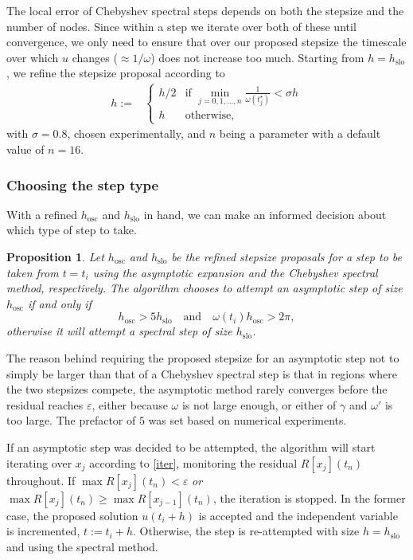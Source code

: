\documentclass[10pt]{article}
\newtheorem{pro}[thm]{Proposition}
\newcommand{\om}{\omega}
\newcommand{\g}{\gamma}
\begin{document}
The local error of Chebyshev spectral steps depends on both the stepsize and
the number of nodes. Since within a step we iterate over both of these until
convergence, we only need to ensure that over our proposed stepsize the
timescale over which $u$ changes ($\approx 1/\om$) does not increase too much. Starting from $h =
h_{\text{slo}}$, we refine the stepsize proposal according to
\begin{align}
    h :=& \begin{cases}
        h/2 &\text{if } \min\limits_{j = 0, 1, \ldots, n}\frac{1}{\om(t^{\star}_j)} < \sigma h \\
        h &\text{otherwise},
    \end{cases}
\end{align}
with $\sigma = 0.8$, chosen experimentally, and $n$ being a
parameter with a default value of $n = 16$.

\subsubsection{Choosing the step type}
\label{steptype}

With a refined $h_{\text{osc}}$ and $h_{\text{slo}}$ in hand, we can make an informed decision about which type of step to take.
\begin{pro}\label{steptypechoose}
    Let $h_{\text{osc}}$ and $h_{\text{slo}}$ be the refined stepsize proposals
    for a step to be taken from $t = t_i$ using the asymptotic expansion and the Chebyshev
    spectral method, respectively. The algorithm chooses to attempt an
    asymptotic step of size $h_{\text{osc}}$ if and only if
$$ h_{\text{osc}} > 5h_{\text{slo}} \quad \text{and} \quad \omega(t_i) h_{\text{osc}} > 2\pi, $$
    otherwise it will attempt a spectral step of size $h_{\text{slo}}$.
\end{pro}
The reason behind requiring the proposed stepsize for an asymptotic step not to
simply be larger than that of a Chebyshev spectral step is that in regions
where the two stepsizes compete, the asymptotic method rarely converges before
the residual reaches $\varepsilon$, either because $\om$ is not large enough, or
either of $\g$ and $\om'$ is too large. The prefactor of $5$ was set based on numerical experiments. 

If an asymptotic step was decided to be attempted, the algorithm will start
iterating over $x_j$ according to \cref{iter}, monitoring the residual
$R[x_j](t_n)$ throughout. If $\max R[x_j](t_n) < \varepsilon$ \emph{or} $\max
R[x_j](t_n) \geq \max R[x_{j-1}](t_n)$, the iteration is stopped. In the former
case, the proposed solution $u(t_i+h)$ is accepted and the independent variable
is incremented, $t := t_i + h$. Otherwise, the step is re-attempted with size
$h = h_{\text{slo}}$ and using the spectral method. 
\end{document}
